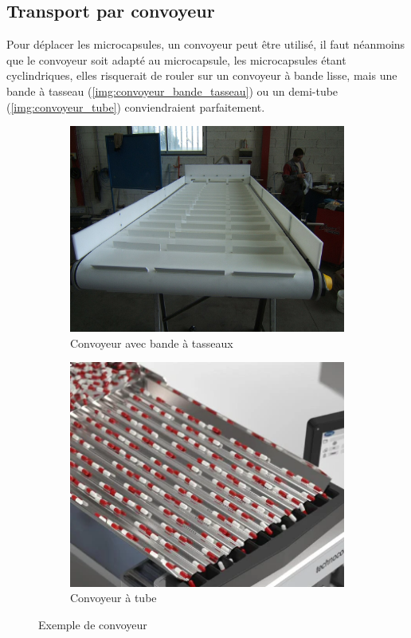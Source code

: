 \subsection*{Transport par convoyeur}
Pour déplacer les microcapsules, un convoyeur peut être utilisé, il faut néanmoins que le convoyeur soit adapté au microcapsule, les microcapsules étant cyclindriques, elles risquerait de rouler sur un convoyeur à bande lisse, mais une bande à tasseau (\cf \autoref{img:convoyeur_bande_tasseau}) ou un demi-tube  (\cf \autoref{img:convoyeur_tube}) conviendraient parfaitement.
\begin{figure}[h!]
    \centering
    \begin{subfigure}{0.45\textwidth}
        \centering
        \includegraphics[width=\linewidth]{assets/figures/Hardware/transport_conv/convoyeur_tasseau.JPG}
        \caption{Convoyeur avec bande à tasseaux\footnotemark}
        \label{img:convoyeur_bande_tasseau}
    \end{subfigure}\hfill
    \begin{subfigure}{0.45\textwidth}
        \centering
        \includegraphics[width=\linewidth]{assets/figures/Hardware/transport_conv/convoyeur_tube.png}
        \caption{Convoyeur à tube\footnotemark}
        \label{img:convoyeur_tube}
    \end{subfigure}
    \caption{Exemple de convoyeur}
\end{figure}
